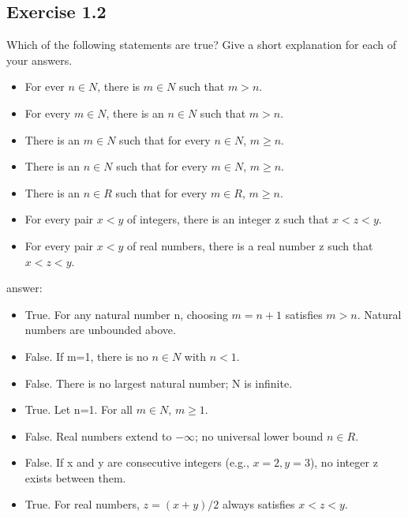 \documentclass[12pt]{article}
\begin{document}
		\subsection*{Exercise 1.2}
			Which of the following statements are true? Give a short explanation for each of your answers.
			\begin{itemize}
				\item For ever $n \in N$, there is $m \in N$ such that $m > n$.
				\item For every $m \in N$, there is an $n \in N$ such that $m > n$.
				\item There is an $m \in N$ such that for every $n \in N$, $m \ge n$.
				\item There is an $n \in N$ such that for every $m \in N$, $m \ge n$.
				\item There is an $n \in R$ such that for every $m \in R$, $m \ge n$.
				\item For every pair $x<y$ of integers, there is an integer z such that $x < z < y$.
				\item For every pair $x < y$ of real numbers, there is a real number z such that $x < z < y$.
			\end{itemize}
			answer:
			\begin{itemize}
				\item True. For any natural number 
				n, choosing $m=n+1$ satisfies $m > n$. Natural numbers are unbounded above.
				\item False. If m=1, there is no $n \in N$ with $n < 1$.
				\item False. There is no largest natural number; N is infinite.
				\item True. Let n=1. For all $m \in N$, $m \ge 1$.
				\item False. Real numbers extend to $-\infty$; no universal lower bound $n \in R$.
				\item False. If x and y are consecutive integers (e.g., $x=2,y=3$), no integer z exists between them.
				\item True. For real numbers, 
				$z = (x+y)/2$ always satisfies $x<z<y$.
			\end{itemize}
\end{document}
